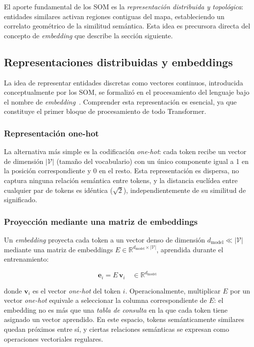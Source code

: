 El aporte fundamental de los SOM es la \textit{representación distribuida y
topológica}: entidades similares activan regiones contiguas del mapa,
estableciendo un correlato geométrico de la similitud semántica. Esta idea
es precursora directa del concepto de \textit{embedding} que describe la
sección siguiente.

\subsection{Representaciones distribuidas y embeddings}
\label{subsec:embeddings}

La idea de representar entidades discretas como vectores continuos,
introducida conceptualmente por los SOM, se formalizó en el procesamiento
del lenguaje bajo el nombre de \textit{embedding}~\cite{mikolov2013word2vec}.
Comprender esta representación es esencial, ya que constituye el primer
bloque de procesamiento de todo Transformer.

\subsubsection*{Representación one-hot}

La alternativa más simple es la codificación \textit{one-hot}: cada token
recibe un vector de dimensión $|\mathcal{V}|$ (tamaño del vocabulario) con
un único componente igual a 1 en la posición correspondiente y 0 en el resto.
Esta representación es dispersa, no captura ninguna relación semántica entre
tokens, y la distancia euclídea entre cualquier par de tokens es idéntica
($\sqrt{2}$), independientemente de su similitud de significado.

\subsubsection*{Proyección mediante una matriz de embeddings}

Un \textit{embedding} proyecta cada token a un vector denso de dimensión
$d_{\text{model}} \ll |\mathcal{V}|$ mediante una matriz de embeddings
$E \in \mathbb{R}^{d_{\text{model}} \times |\mathcal{V}|}$, aprendida durante
el entrenamiento:

\begin{equation}
    \bm{e}_i = E\,\bm{v}_i \quad \in \mathbb{R}^{d_{\text{model}}}
\end{equation}

\noindent donde $\bm{v}_i$ es el vector \textit{one-hot} del token $i$.
Operacionalmente, multiplicar $E$ por un vector \textit{one-hot} equivale a
seleccionar la columna correspondiente de $E$: el embedding no es más que una
\textit{tabla de consulta} en la que cada token tiene asignado un vector
aprendido. En este espacio, tokens semánticamente similares quedan próximos
entre sí, y ciertas relaciones semánticas se expresan como operaciones
vectoriales regulares.

